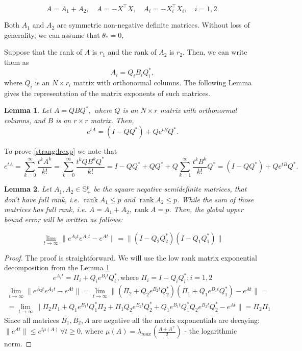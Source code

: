\documentclass{article}
\newtheorem{lemma}{Lemma}
\begin{document}
$$
A = A_1 + A_2, \quad A = -X^{\top} X, \quad A_i = -X^{\top}_i X_i, \quad i = 1, 2.
$$

Both $A_1$ and $A_2$ are symmetric non-negative definite matrices. Without loss of generality, we can assume that $\theta_* = 0$,

Suppose that the rank of $A$ is $r_1$ and the rank of $A_2$ is $r_2$. Then, we can write them as
$$
A_i = Q_i B_i Q^*_i,
$$
where $Q_i$ is an $N \times r_i$ matrix with orthonormal columns.  The following Lemma gives the representation of the matrix exponents of such matrices.
\begin{lemma}\label{strang:lemexp}
Let $A = Q B Q^*,$ where $Q$ is an $N \times r$ matrix with orthonormal columns, and $B$ is an $r \times r$ matrix. Then,
\begin{equation}\label{strang:lrexp}
    e^{t A}  = (I - QQ^*) + Q e^{t B} Q^*.
\end{equation}
\end{lemma}
To prove \eqref{strang:lrexp} we note that
$$e^{t A} = \sum_{k=0}^{\infty} \frac{t^k A^k}{k!} = \sum_{k=0}^{\infty} \frac{t^k Q B^k Q^*}{k!} =
I - QQ^* + QQ^* + Q \sum_{k=1}^{\infty} \frac{t^k B^k}{k!} Q^* = (I - QQ^*) + Q e^{t B} Q^*.
$$

\begin{lemma}
	\label{strang:lemupper_2}
	Let $A_1, A_2 \in \mathbb{S}^p_{+}$ be the square negative semidefinite matrices, that don't have full rank, i.e. $\operatorname{rank}{A_1} \leq p$ and $\operatorname{rank}{A_2} \leq p$. While the sum of those matrices has full rank, i.e. $A = A_1 + A_2, \operatorname{rank}{A} = p$. Then, the global upper bound error will be written as follows:

	\begin{equation}\label{strang:lemupper}
		\lim_{t \to \infty}\| e^{A_2t}e^{A_1t} - e^{At}\| = \|(I - Q_2Q_2^*)(I - Q_1Q_1^*)\|
	\end{equation}
\end{lemma}
\begin{proof}
	The proof is straightforward. We will use the low rank matrix exponential decomposition from the Lemma \ref{strang:lemexp}
	$$
	e^{A_it} = \Pi_i + Q_i e^{B_it} Q_i^*, \text{where } \Pi_i = I - Q_iQ_i^*; i = 1,2
	$$
	\begin{align*}
	\lim_{t \to \infty}\| e^{A_2t}e^{A_1t} - e^{At}\| = \lim_{t \to \infty}\| (\Pi_2 + Q_2 e^{B_2t} Q_2^*)(\Pi_1 + Q_1 e^{B_1t} Q_1^*) - e^{At}\| = \\
	= \lim_{t \to \infty}\| \Pi_2\Pi_1 + Q_1 e^{B_1t} Q_1^*\Pi_2 + \Pi_1Q_2 e^{B_2t} Q_2^* +  Q_1 e^{B_1t} Q_1^* Q_2 e^{B_2t} Q_2^* - e^{At}\| = \Pi_2 \Pi_1
	\end{align*}
	Since all matrices $B_1, B_2, A$ are negative all the matrix exponentials are decaying: $\|e^{At}\|\leq e^{t\mu (A)}\, \forall t\geq 0$, where $\mu(A) = \lambda_{max} \left( \frac{A + A^\top}{2}\right)$ - the logarithmic norm.
\end{proof}
\end{document}
